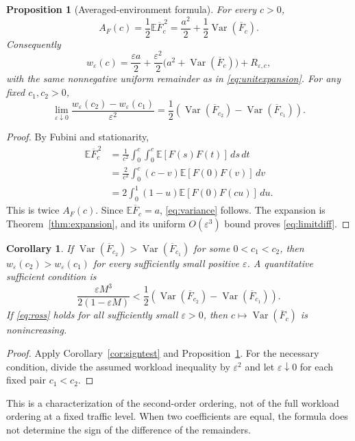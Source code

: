 \documentclass[10pt,a4paper]{amsart}
\numberwithin{equation}{section}
\newtheorem{proposition}[theorem]{Proposition}
\newtheorem{corollary}[theorem]{Corollary}
\newcommand{\E}{\mathbb E}
\newcommand{\1}{\mathbf 1}
\newcommand{\eps}{\varepsilon}
\DeclareMathOperator{\Var}{Var}
\begin{document}
\begin{proposition}[Averaged-environment formula]\label{prop:variance}
For every $c>0$,
\begin{equation}\label{eq:variance}
 A_F(c)=\frac12\E\overline F_c^{\,2}
       =\frac{a^2}{2}+\frac12\Var(\overline F_c).
\end{equation}
Consequently
\begin{equation}\label{eq:varianceexpansion}
 w_\eps(c)=\frac{\eps a}{2}
 +\frac{\eps^2}{2}\bigl(a^2+\Var(\overline F_c)\bigr)+R_{\eps,c},
\end{equation}
with the same nonnegative uniform remainder as in \eqref{eq:unitexpansion}. For any fixed $c_1,c_2>0$,
\begin{equation}\label{eq:limitdiff}
 \lim_{\eps\downarrow0}
 \frac{w_\eps(c_2)-w_\eps(c_1)}{\eps^2}
 =\frac12\left(\Var(\overline F_{c_2})-\Var(\overline F_{c_1})\right).
\end{equation}
\end{proposition}
\begin{proof}
By Fubini and stationarity,
\begin{align*}
 \E\overline F_c^{\,2}
 &=\frac1{c^2}\int_0^c\int_0^c\E[F(s)F(t)]\,ds\,dt\\
 &=\frac2{c^2}\int_0^c(c-v)\E[F(0)F(v)]\,dv\\
 &=2\int_0^1(1-u)\E[F(0)F(cu)]\,du.
\end{align*}
This is twice $A_F(c)$. Since $\E\overline F_c=a$, \eqref{eq:variance} follows. The expansion is Theorem~\ref{thm:expansion}, and its uniform $O(\eps^3)$ bound proves \eqref{eq:limitdiff}.
\end{proof}

\begin{corollary}\label{cor:variancecriterion}
If $\Var(\overline F_{c_2})>\Var(\overline F_{c_1})$ for some $0<c_1<c_2$, then $w_\eps(c_2)>w_\eps(c_1)$ for every sufficiently small positive $\eps$. A quantitative sufficient condition is
\begin{equation}\label{eq:varianceeps}
 \frac{\eps M^3}{2(1-\eps M)}
 <\frac12\left(\Var(\overline F_{c_2})-\Var(\overline F_{c_1})\right).
\end{equation}
If \eqref{eq:ross} holds for all sufficiently small $\eps>0$, then $c\mapsto\Var(\overline F_c)$ is nonincreasing.
\end{corollary}
\begin{proof}
Apply Corollary~\ref{cor:signtest} and Proposition~\ref{prop:variance}. For the necessary condition, divide the assumed workload inequality by $\eps^2$ and let $\eps\downarrow0$ for each fixed pair $c_1<c_2$.
\end{proof}
This is a characterization of the second-order ordering, not of the full workload ordering at a fixed traffic level. When two coefficients are equal, the formula does not determine the sign of the difference of the remainders.
\end{document}
